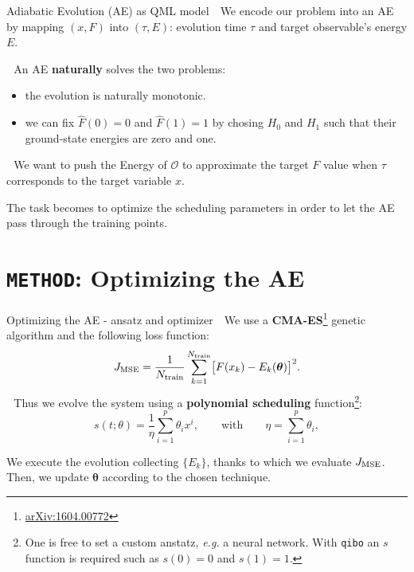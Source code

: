 \documentclass[8pt, xcolor={svgnames}, hyperref={colorlinks, linkcolor=black, citecolor=amethyst, urlcolor=amethyst}]{beamer}
\begin{document}
\begin{frame}[fragile]{Adiabatic Evolution (AE) as QML model}
\large
\faArrowCircleRight\,\, We encode our problem into an AE by mapping 
$(x, F)$ into $(\tau, E)$: evolution time $\tau$ and target observable's energy $E$.   
\pause 

\faArrowCircleRight\,\, An AE \textbf{naturally} solves the two problems:
\pause
\begin{itemize}[noitemsep]
    \item[\faLineChart] the evolution is naturally monotonic.
    \pause
    \item[\faChain] we can fix $\hat{F}(0)=0$ and $\hat{F}(1)=1$ by chosing $H_0$ and $H_1$
    such that their ground-state energies are zero and one.
\end{itemize}

\pause
\faArrowCircleRight\,\, We want to push the Energy of $\mathcal{O}$ to approximate
the target $F$ value when $\tau$ corresponds to the target variable $x$.

\pause
\vspace{0.3cm}
\begin{tcolorbox}[colback=amethyst!15, title=Optimizing the AE]
The task becomes to optimize the scheduling parameters in order to let the 
AE pass through the training points.
\end{tcolorbox}
\end{frame}

\section{\texttt{METHOD}: Optimizing the AE}

\begin{frame}[fragile]{Optimizing the AE - ansatz and optimizer}
\large
\faArrowCircleRight\,\, We use a \textbf{CMA-ES}\footnote<1->{\href{https://arxiv.org/abs/1604.00772}{arXiv:1604.00772}} 
genetic algorithm and the following loss function:
\begin{equation}
    J_{\rm MSE} = \frac{1}{N_{\rm train}} \sum_{k = 1}^{N_{\rm train}} 
    \bigl[ F(x_k) - E_k(\bm{\theta}) \bigr]^2.
    \label{eq:loss_function}
\end{equation}
\pause
\faArrowCircleRight\,\, Thus we evolve the system using a \textbf{polynomial scheduling} 
function\footnote<2->{One is free to set a custom anstatz, \textit{e.g.} a neural 
network. With \texttt{qibo} an $s$ function is required such as $s(0)=0$ and $s(1)=1$.}:
\begin{equation}
s(t;\theta) = \frac{1}{\eta} \sum_{i=1}^{p} \theta_i x^{i}, \qquad
\text{with} \qquad \eta = \sum_{i=1}^{p} \theta_i,
\label{eq:scheduling_ansatz}
\end{equation}
\pause  
\vspace{0.1cm}
\begin{tcolorbox}[colback=amethyst!15, title=In each optimization step]
    We execute the evolution collecting $\{E_k\}    $, thanks to which we evaluate
    $J_{\rm MSE}$. Then, we update $\bm{\theta}$ according to the chosen technique.
\end{tcolorbox}
\end{frame}
\end{document}
